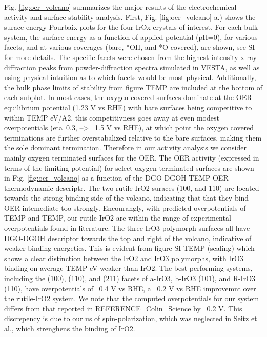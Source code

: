 Fig. \ref{fig:oer_volcano} summarizes the major results of the electrochemical activity and surface stability analysis.
First, Fig. \ref{fig:oer_volcano} a.) shows the surace energy Pourbaix plots for the four IrOx crystals of interest. For each bulk system, the surface energy as a function of applied potential (pH=0), for various facets, and at various coverages (bare, *OH, and *O covered), are shown, see SI for more details.
The specific facets were chosen from the highest intensity x-ray diffraction peaks from powder-diffraction spectra simulated in VESTA,
as well as using physical intuition as to which facets would be most physical.
Additionally, the bulk phase limits of stability from figure TEMP are included at the bottom of each subplot.
In most cases, the oxygen covered surfaces dominate at the OER equilibrium potential (1.23 V vs RHE) with bare surfaces being competitive to within TEMP eV/A2,
this competitivness goes away at even modest overpotentials (eta~0.3, --> ~1.5 V vs RHE),
at which point the oxygen covered terminations are further overstabalized relative to the bare surfaces,
making them the sole dominant termination.
Therefore in our activity analysis we consider mainly oxygen terminated surfaces for the OER.
The OER activity (expressed in terms of the limiting potential) for select oxygen terminated surfaces are shown in Fig. \ref{fig:oer_volcano} as a function of the DGO-DGOH TEMP OER thermodynamic descriptr.
The two rutile-IrO2 suraces (100, and 110) are located towards the strong binding side of the volcano, indicating that that they bind OER intemediate too strongly.
Encourangly, with predicted overpotentials of TEMP and TEMP, our rutile-IrO2 are within the range of experimental overpotentials found in literature.
The three IrO3 polymorph surfaces all have DGO-DGOH descriptor towards the top and right of the volcano, indicative of weaker binding energetics.
This is evident from figure SI TEMP (scaling) which shows a clear distinction between the IrO2 and IrO3 polymorphs, with IrO3 binding on average TEMP eV weaker than IrO2.
The best performing systems, including the (100), (110), and (211) facets of a-IrO3, b-IrO3 (101), and R-IrO3 (110), have overpotentials of ~0.4 V vs RHE,
a ~0.2 V vs RHE improvemnt over the rutile-IrO2 system.
We note that the computed  overpotentials for our \rIrOtwo system differs from that reported in REFERENCE_Colin_Science by ~0.2 V. This discrepency is due to our us of spin-polarization, which was neglected in Seitz et al., which strenghens the binding of IrO2.


